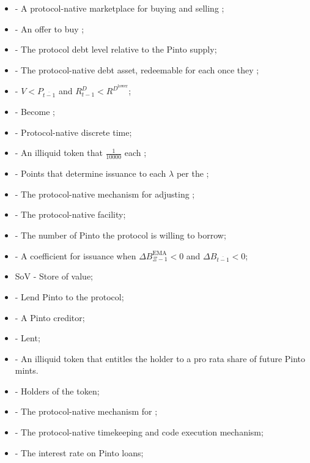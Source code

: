 \documentclass[class=article, crop=false]{standalone}
\begin{document}
\begin{itemize}[topsep=0pt, itemsep=3pt,leftmargin=16pt]
    \item[]  - A protocol-native marketplace for buying and selling ;
    \item[]  - An offer to buy ;
    \item[]  - The protocol debt level relative to the Pinto supply;
    \item[]  - The protocol-native debt asset, redeemable for  each once they ;
    \item[]  - $V < P_{\overline{t-1}}$ and $R_{t-1}^{D} < R^{D^{\text{lower}}}$;
    \item[]  - Become ;
    \item[]  - Protocol-native discrete time;
    \item[]  - An illiquid token that  $\frac{1}{10000}$  each ;
    \item[]  - Points that determine  issuance to each $\lambda$ per the ;
    \item[]  - The protocol-native mechanism for adjusting ;
    \item[]  - The protocol-native  facility;
    \item[]  - The number of Pinto the protocol is willing to borrow;
    \item[]  - A coefficient for  issuance when $\Delta B_{\Xi-1}^{\text{EMA}} < 0$ and $\Delta B_{\overline{t-1}} < 0$;
    \item[] SoV - Store of value;
    \item[]  - Lend Pinto to the protocol;
    \item[]  - A Pinto creditor;
    \item[]  - Lent;
    \item[]  - An illiquid token that entitles the holder to a pro rata share of future Pinto mints.
    \item[]  - Holders of the  token;
    \item[]  - The protocol-native mechanism for ;
    \item[]  - The protocol-native timekeeping and code execution mechanism;
    \item[]  - The interest rate on Pinto loans;

\end{itemize}
\end{document}
